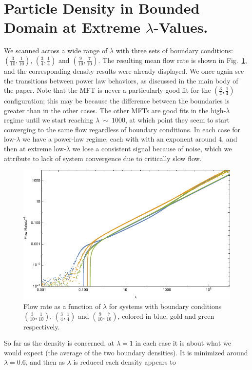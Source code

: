 \documentclass[
reprint, amsmath,amssymb, aps,
 pre, longbibliography,
]{revtex4-1}
\begin{document}
\section{Particle Density in Bounded Domain at Extreme $\lambda$-Values.}
We scanned across a wide range of $\lambda$ with three sets of boundary conditions: $(\frac{3}{10}, \frac{1}{10})$, $(\frac{3}{4}, \frac{1}{4})$ and $(\frac{9}{10}, \frac{7}{10})$. The resulting mean flow rate is shown in
Fig.~\ref{fig:largeFlow}, and the corresponding density results were already displayed. We once again see the transitions between power law behaviors, as discussed in the main body of the paper. Note that the MFT is never a particularly good
fit for the $(\frac{3}{4}, \frac{1}{4})$ configuration; this may be because the difference between the boundaries is greater than in the other cases. The other MFTs are good fits in the high-$\lambda$ regime until we start reaching $\lambda~\sim~1000$,
at which point they seem to start converging to the same flow regardless of boundary conditions. In each case for low-$\lambda$ we have a power-law regime, each with with an exponent around $4$, and then at extreme low-$\lambda$ we lose
a consistent signal because of noise, which we attribute to lack of system convergence due to critically slow flow.
\begin{figure}[h!]
\vspace{1em}
\caption{\label{fig:largeFlow} Flow rate as a function of $\lambda$ for systems with boundary conditions $(\frac{3}{10}, \frac{1}{10})$, $(\frac{3}{4}, \frac{1}{4})$ and $(\frac{9}{10}, \frac{7}{10})$, colored in blue, gold and green
respectively.}
    \includegraphics[width=0.95\linewidth]{largeRangeFlow}
    \vspace{0em}
\end{figure}
So far as the density is concerned, at $\lambda=1$ in each case it is about what we would expect (the average of the two boundary densities). It is minimized around $\lambda = 0.6$, and then as $\lambda$ is reduced each density appears to 
\end{document}
